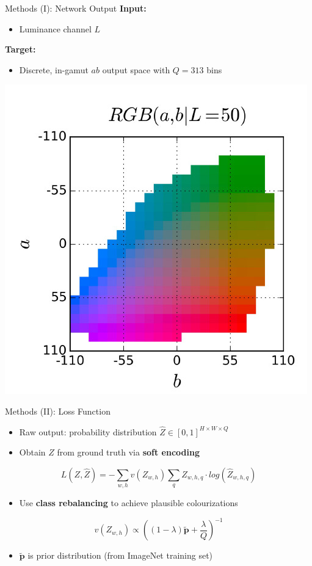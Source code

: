 \documentclass{beamer}
\begin{document}

\begin{frame}{Methods (I): Network Output}
  \textbf{Input:}
    \begin{itemize}
       \item Luminance channel $L$
    \end{itemize}

  \medskip

  \textbf{Target:}
    \begin{itemize}
      \item Discrete, in-gamut $ab$ output space with $Q = 313$ bins
    \end{itemize}

  \medskip

  \begin{center}
    \includegraphics[width=.4\linewidth]{resources/gamut.jpg}
  \end{center}
\end{frame}

\begin{frame}{Methods (II): Loss Function}
  \begin{itemize}
    \item Raw output: probability distribution $\hat{Z} \in [0, 1]^{H \times W \times Q}$
    \item Obtain $Z$ from ground truth via \textbf{soft encoding}
  \end{itemize}

  \begin{equation}
    L(Z, \hat{Z}) = -\sum_{w,h} v(Z_{w,h}) \sum_q Z_{w,h,q} \cdot log(\hat{Z}_{w,h,q})
  \end{equation}

  \begin{itemize}
    \item Use \textbf{class rebalancing} to achieve plausible colourizations
  \end{itemize}

  \begin{equation}
    v(Z_{w,h}) \propto \left((1 - \lambda) \tilde{\bm{p}} + \frac{\lambda}{Q} \right)^{-1}
  \end{equation}

  \begin{itemize}
    \item $\tilde{\bm{p}}$ is prior distribution (from ImageNet training set)
  \end{itemize}
\end{frame}
\end{document}
